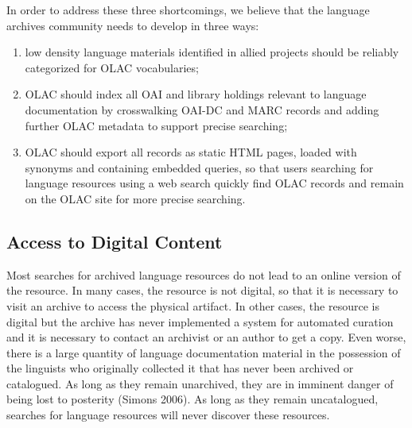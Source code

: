 
In order to address these three shortcomings, we believe that the
language archives community needs to develop in three ways:

\begin{enumerate}\setlength{\itemsep}{0pt}
\item low density language materials identified in allied projects
      should be reliably categorized for OLAC vocabularies;
\item OLAC should index all OAI and library holdings relevant to language
      documentation by crosswalking OAI-DC and MARC records and
      adding further OLAC metadata to support precise searching;
\item OLAC should export all records as static HTML pages, loaded with
      synonyms and containing embedded queries, so that
      users searching for language resources using a web search
      quickly find OLAC records and remain on the OLAC site for
      more precise searching.
\end{enumerate}

\subsection{Access to Digital Content}



Most searches for archived language resources do not lead to an online version
of the resource.  In many cases, the resource is not digital, so
that it is necessary to visit an archive to access the physical artifact.
In other cases, the resource is digital but the archive has never
implemented a system for automated curation and it is necessary to
contact an archivist or an author to get a copy.  Even worse, there is a large quantity of language
documentation material in the possession of the linguists who
originally collected it that has never been archived or catalogued.
As long as they remain unarchived, they are in imminent danger of
being lost to posterity (Simons 2006). 
As long as they remain uncatalogued, searches for language resources
will never discover these resources.


